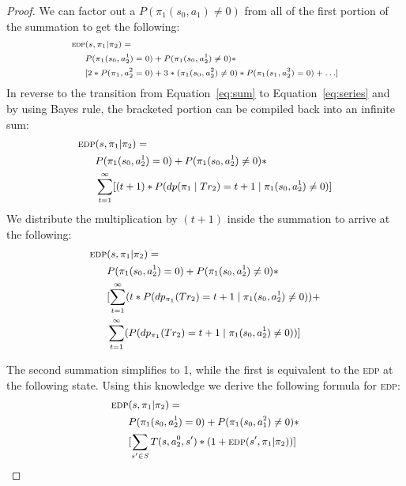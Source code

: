 \documentclass[letterpaper]{article}
\begin{document}
\begin{proof}
\noindent We can factor out a $P(\pi_1(s_0, a_1) \neq 0)$ from all of the first portion of the summation to get the following:
\begin{equation*}
\scriptsize
\begin{split}
    \textsc{edp} & (s, \pi_1 | \pi_2) = \\
    & P(\pi_1(s_0, a_2^1) = 0) + P(\pi_1(s_0, a_2^1) \neq 0) * \\
    & [2*P(\pi_1, a_2^2 = 0) + 3*(\pi_1(s_0, a_2^2) \neq 0)*P(\pi_1(s_1, a_2^3) = 0) + \ldots]
\end{split}
\normalsize
\end{equation*}
In reverse to the transition from Equation~\ref{eq:sum} to Equation~\ref{eq:series} and by using Bayes rule, the bracketed portion can be compiled back into an infinite sum: %
\begin{equation*}
\small
\begin{split}
    \textsc{edp} & (s, \pi_1 | \pi_2) = \\
    & P(\pi_1(s_0, a^1_2) = 0) + P(\pi_1(s_0, a^1_2) \neq 0) * \\ & \sum\limits_{t=1}^\infty[(t+1) * P(dp(\pi_1 \mid Tr_2) = t+1 \mid \pi_1(s_0, a^1_2) \neq 0)]
\end{split}
\normalsize
\end{equation*}
We distribute the multiplication by $(t+1)$ inside the summation to arrive at the following:
\begin{equation*}
\small
\begin{split}
    \textsc{edp} & (s, \pi_1 | \pi_2) = \\
    & P(\pi_1(s_0,a_2^1) = 0) + P(\pi_1(s_0, a_2^1) \neq 0) * \\ & [\sum\limits_{t=1}^\infty(t * P(dp_{\pi_1}(Tr_2) = t+1 \mid \pi_1(s_0, a_2^1) \neq 0)) + \\ & \sum\limits_{t=1}^\infty (P(dp_{\pi_1}(Tr_2) = t+1 \mid \pi_1(s_0, a_2^1) \neq 0))]
\end{split}
\normalsize
\end{equation*}

\noindent The second summation simplifies to 1, while the first is equivalent to the \textsc{edp} at the following state. Using this knowledge %
we derive the following formula for \textsc{edp}:
\begin{equation*}
\small
\begin{split}
    \textsc{edp} & (s, \pi_1 |  \pi_2) = \\
    & P(\pi_1(s_0, a_2^1) = 0) + P(\pi_1(s_0, a^2_1) \neq 0) * \\ &
    [\sum\limits_{s'\in S}T(s,a_2^0,s')*(1+\textsc{edp}(s', \pi_1 | \pi_2))]
\end{split}
\normalsize
\end{equation*}


\end{proof}
\end{document}
